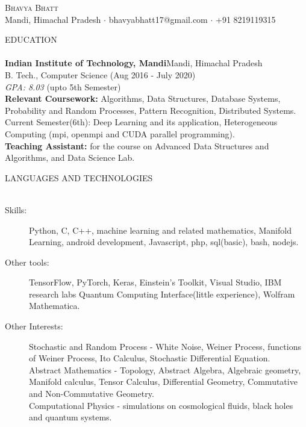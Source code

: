 \documentclass[a4paper]{article}
\newcommand{\lineunder} {
    \vspace*{-8pt} \\
    \hspace*{-18pt} \hrulefill \\
}
\newcommand{\header} [1] {
    {\hspace*{-18pt}\vspace*{6pt} \textsc{#1}}
    \vspace*{-6pt} \lineunder
}
\begin{document}
\vspace*{-40pt}

    

\vspace*{-10pt}
\begin{center}
    {\Huge \scshape {Bhavya Bhatt}}\\
    Mandi, Himachal Pradesh $\cdot$ bhavyabhatt17@gmail.com $\cdot$ +91 8219119315\\
\end{center}

\header{EDUCATION}
\textbf{Indian Institute of Technology, Mandi}\hfill Mandi, Himachal Pradesh\\
B. Tech., Computer Science (Aug 2016 - July 2020)\\
 \textit{GPA: 8.03} (upto 5th Semester)\\
\vspace{2mm}
\textbf{Relevant Coursework:}
Algorithms, Data Structures, Database Systems, Probability and Random
Processes, Pattern Recognition, Distributed Systems. \\
Current Semester(6th): Deep Learning and its application, Heterogeneous Computing (mpi, openmpi and CUDA parallel programming). \\
\vspace{2mm}
\textbf{Teaching Assistant:}
for the course on Advanced Data Structures and Algorithms, and Data Science Lab.\\
\vspace{2mm}

\header{LANGUAGES AND TECHNOLOGIES}
\begin{description}
\item [Skills:] Python, C, C++, machine learning and related mathematics, Manifold
Learning, android development, Javascript, php, sql(basic), bash, nodejs.
\item [Other tools:] TensorFlow, PyTorch, Keras, Einstein’s Toolkit, Visual Studio, IBM research labs Quantum Computing Interface(little experience), Wolfram Mathematica.
\item [Other Interests:] Stochastic and Random Process - White Noise, Weiner Process, functions of
Weiner Process, Ito Calculus, Stochastic Differential Equation.\\
Abstract Mathematics - Topology, Abstract Algebra, Algebraic geometry, Manifold calculus,
Tensor Calculus, Differential Geometry, Commutative and Non-Commutative Geometry.\\
Computational Physics - simulations on cosmological fluids, black holes and quantum systems.
\end{description}
\vspace{2mm}
\end{document}
